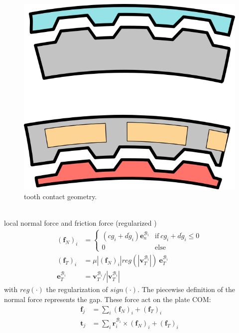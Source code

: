 \documentclass[a4paper,fleqn]{cas-dc}
\begin{document}
\begin{figure}
	\centering
	\includegraphics[scale=.75]{figs/toothcontacts.png}
	\caption{tooth contact geometry.}
	\label{fig:teeth}
\end{figure}\\
local normal force and friction force (regularized \cite{vielsack1996regularisierung}) 
\begin{align}
	\left(\textbf{f}_N\right)_i & = \left\{
	\begin{array}{ll}
	(c g_i + d \dot g_i)\textbf{e}_n^{\mathcal{B}_i} & \textrm{if}~c g_i + d \dot g_i \leq 0\\
	0 & \textrm{else}
	\end{array}\right.\\
	\left(\textbf{f}_T\right)_i & = \mu \left|\left(\textbf{f}_N\right)_i \right| reg\left(\left|\textbf{v}_T^{\mathcal{B}_i}\right|\right) \ \textbf{e}_T^{\mathcal{B}_i}\\
	\textbf{e}_T^{\mathcal{B}_i}& = \textbf{v}_T^{\mathcal{B}_i}\big/ 	\left|\textbf{v}_T^{\mathcal{B}_i}\right|
\end{align}
with $reg(\cdot)$ the regularization of $sign(\cdot)$. The piecewise definition of the normal force represents the gap. These force act on the plate COM: 
\begin{align}
	\mathbf{f}_j & = \sum_i \left(\textbf{f}_N\right)_i + \left(\textbf{f}_T\right)_i\\
	\mathbf{t}_j & = \sum_i \mathbf{r}_{i}^{\mathcal{B}_i} \times \left(\textbf{f}_N\right)_i + \left(\textbf{f}_T\right)_i
\end{align}
\end{document}
